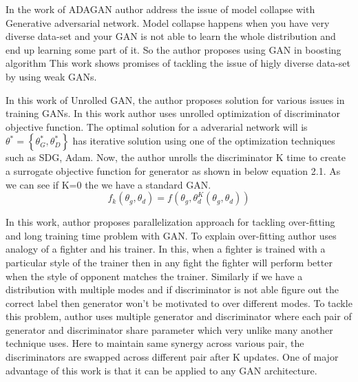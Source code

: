 In the work of ADAGAN author address the issue of model collapse with Generative adversarial network. Model collapse happens when you have very diverse data-set and your GAN is not able to learn the whole distribution and end up learning some part of it. So the author proposes using GAN in boosting algorithm This work shows promises of tackling the issue of higly diverse data-set by using weak GANs.
\par

In this work of Unrolled GAN, the author proposes solution for various issues in training GANs. 
In this work author uses unrolled optimization of discriminator objective function.  The optimal solution for a adverarial network will is $\theta^{*} =\left\{\theta^{*}_{G}, \theta^{*}_{D}\right\}$ has iterative solution using one of the optimization techniques such as SDG, Adam. Now, the author unrolls the discriminator K time to create a surrogate objective function for generator as shown in below equation 2.1. As we can see if K=0 the we have a standard GAN.
\begin{equation}
f_{k}{ \left( \theta _{g}, \theta _{d} \right) }=f \left( \theta _{g}, \theta _{d}^{K}{ \left( \theta _{g}, \theta _{d} \right) } \right)
\end{equation}

In this work, author proposes parallelization approach for tackling over-fitting and long training time problem with GAN. To explain over-fitting author uses analogy of a fighter and his trainer. In this, when a fighter is trained with a particular style of the trainer then in any fight the fighter will perform better when the style of opponent matches the trainer. Similarly if  we have a distribution with multiple modes and if discriminator is not able figure out the correct label then generator won't be motivated to over different modes. To tackle this problem, author uses multiple generator and discriminator where each pair of generator and discriminator share parameter which very unlike many another technique uses. Here to maintain same synergy across various pair, the discriminators are swapped across different pair after K updates.  One of major advantage of this work is that it can be applied to any GAN architecture.
